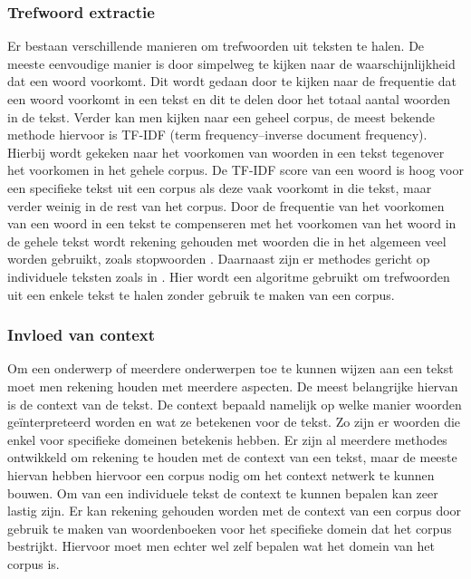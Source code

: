 \subsubsection{Trefwoord extractie}
Er bestaan verschillende manieren om trefwoorden uit teksten te halen. De meeste eenvoudige manier is door simpelweg te kijken naar de waarschijnlijkheid dat een woord voorkomt. Dit wordt gedaan door te kijken naar de frequentie dat een woord voorkomt in een tekst en dit te delen door het totaal aantal woorden in de tekst. Verder kan men kijken naar een geheel corpus, de meest bekende methode hiervoor is TF-IDF (term frequency–inverse document frequency)\citep{ramos2003using}. Hierbij wordt gekeken naar het voorkomen van woorden in een tekst tegenover het voorkomen in het gehele corpus. De TF-IDF score van een woord is hoog voor een specifieke tekst uit een corpus als deze vaak voorkomt in die tekst, maar verder weinig in de rest van het corpus. Door de frequentie van het voorkomen van een woord in een tekst te compenseren met het voorkomen van het woord in de gehele tekst wordt rekening gehouden met woorden die in het algemeen veel worden gebruikt, zoals stopwoorden \citep{aggarwal2012survey}. 
Daarnaast zijn er methodes gericht op individuele teksten zoals in \cite{matsuo2004keyword}. Hier wordt een algoritme gebruikt om trefwoorden uit een enkele tekst te halen zonder gebruik te maken van een corpus. 

\subsubsection{Invloed van context}
Om een onderwerp of meerdere onderwerpen toe te kunnen wijzen aan een tekst moet men rekening houden met meerdere aspecten. De meest belangrijke hiervan is de context van de tekst. De context bepaald namelijk op welke manier woorden geïnterpreteerd worden en wat ze betekenen voor de tekst. Zo zijn er woorden die enkel voor specifieke domeinen betekenis hebben. Er zijn al meerdere methodes ontwikkeld om rekening te houden met de context van een tekst, maar de meeste hiervan hebben hiervoor een corpus nodig om het context netwerk te kunnen bouwen. Om van een individuele tekst de context te kunnen bepalen kan zeer lastig zijn. Er kan rekening gehouden worden met de context van een corpus door gebruik te maken van woordenboeken voor het specifieke domein dat het corpus bestrijkt. Hiervoor moet men echter wel zelf bepalen wat het domein van het corpus is. \citep{aggarwal2012survey}
